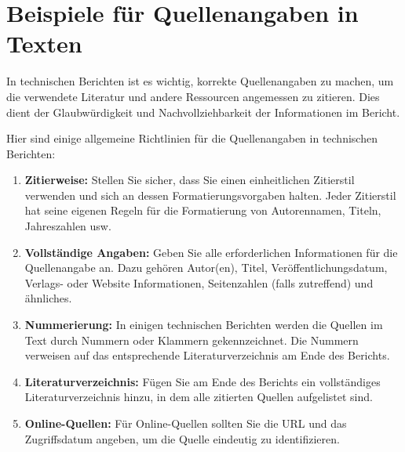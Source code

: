 \documentclass[praktikum,german]{hgbthesis}
\begin{document}



\chapter{Beispiele für Quellenangaben in Texten}

In technischen Berichten ist es wichtig, korrekte Quellenangaben zu machen, um die verwendete Literatur und andere Ressourcen angemessen zu zitieren. Dies dient der Glaubwürdigkeit und Nachvollziehbarkeit der Informationen im Bericht.


\noindent Hier sind einige allgemeine Richtlinien für die Quellenangaben in technischen Berichten:\\

\begin{enumerate}
	\item \textbf{Zitierweise:} Stellen Sie sicher, dass Sie einen einheitlichen Zitierstil verwenden und sich an dessen Formatierungsvorgaben halten. Jeder Zitierstil hat seine eigenen
				Regeln für die Formatierung von Autorennamen, Titeln, Jahreszahlen usw.
	\item \textbf{Vollständige Angaben:} Geben Sie alle erforderlichen Informationen für die Quellenangabe an. Dazu gehören Autor(en), Titel, Veröffentlichungsdatum, Verlags- oder Website
				Informationen, Seitenzahlen (falls zutreffend) und ähnliches.
	\item \textbf{Nummerierung:} In einigen technischen Berichten werden die Quellen im Text durch Nummern oder Klammern gekennzeichnet. Die Nummern verweisen auf das entsprechende
				Literaturverzeichnis am Ende des Berichts.
	\item \textbf{Literaturverzeichnis:} Fügen Sie am Ende des Berichts ein vollständiges Literaturverzeichnis hinzu, in dem alle zitierten Quellen aufgelistet sind.
	\item \textbf{Online-Quellen:} Für Online-Quellen sollten Sie die URL und das Zugriffsdatum angeben, um die Quelle eindeutig zu identifizieren.
\end{enumerate}
\end{document}
